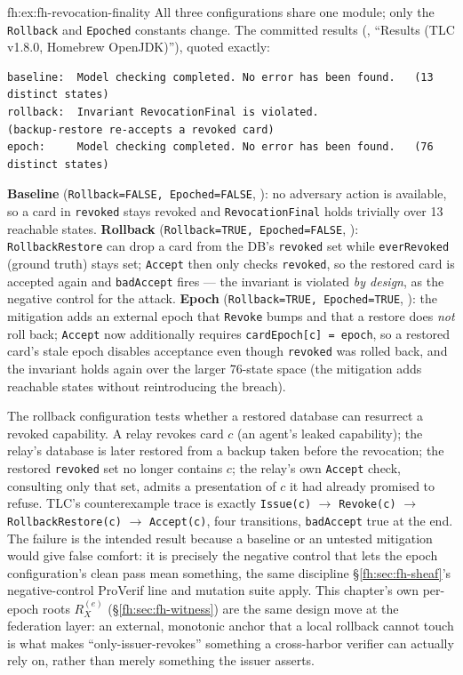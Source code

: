 \begin{pdSolution}{fh:ex:fh-revocation-finality}
All three configurations share one module; only the \texttt{Rollback} and \texttt{Epoched} constants change. The committed results (, ``Results (TLC v1.8.0, Homebrew OpenJDK)''), quoted exactly:
\begin{lstlisting}
baseline:  Model checking completed. No error has been found.   (13 distinct states)
rollback:  Invariant RevocationFinal is violated.               (backup-restore re-accepts a revoked card)
epoch:     Model checking completed. No error has been found.   (76 distinct states)
\end{lstlisting}
\textbf{Baseline} (\texttt{Rollback=FALSE, Epoched=FALSE}, ): no adversary action is available, so a card in \texttt{revoked} stays revoked and \texttt{RevocationFinal} holds trivially over 13 reachable states. \textbf{Rollback} (\texttt{Rollback=TRUE, Epoched=FALSE}, ): \texttt{RollbackRestore} can drop a card from the DB's \texttt{revoked} set while \texttt{everRevoked} (ground truth) stays set; \texttt{Accept} then only checks \texttt{revoked}, so the restored card is accepted again and \texttt{badAccept} fires --- the invariant is violated \emph{by design}, as the negative control for the attack. \textbf{Epoch} (\texttt{Rollback=TRUE, Epoched=TRUE}, ): the mitigation adds an external epoch that \texttt{Revoke} bumps and that a restore does \emph{not} roll back; \texttt{Accept} now additionally requires \texttt{cardEpoch[c] = epoch}, so a restored card's stale epoch disables acceptance even though \texttt{revoked} was rolled back, and the invariant holds again over the larger 76-state space (the mitigation adds reachable states without reintroducing the breach).

The rollback configuration tests whether a restored database can resurrect a revoked capability. A relay revokes card $c$ (an agent's leaked capability); the relay's database is later restored from a backup taken before the revocation; the restored \texttt{revoked} set no longer contains $c$; the relay's own \texttt{Accept} check, consulting only that set, admits a presentation of $c$ it had already promised to refuse. TLC's counterexample trace is exactly \texttt{Issue(c)} $\to$ \texttt{Revoke(c)} $\to$ \texttt{RollbackRestore(c)} $\to$ \texttt{Accept(c)}, four transitions, \texttt{badAccept} true at the end. The failure is the intended result because a baseline or an untested mitigation would give false comfort: it is precisely the negative control that lets the epoch configuration's clean pass mean something, the same discipline \S\ref{fh:sec:fh-sheaf}'s negative-control ProVerif line and mutation suite apply. This chapter's own per-epoch roots $R_X^{(e)}$ (\S\ref{fh:sec:fh-witness}) are the same design move at the federation layer: an external, monotonic anchor that a local rollback cannot touch is what makes ``only-issuer-revokes'' something a cross-harbor verifier can actually rely on, rather than merely something the issuer asserts.
\end{pdSolution}
